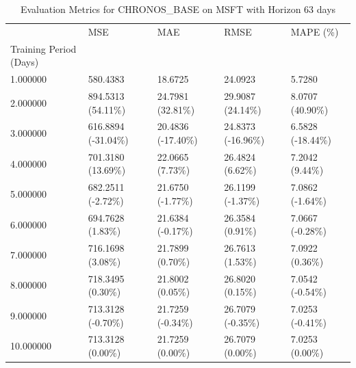 \begin{table}
\caption{Evaluation Metrics for CHRONOS_BASE on MSFT with Horizon 63 days}
\label{tab:chronos_base_MSFT_h63_metrics}
\begin{tabular}{lllll}
\toprule
 & MSE & MAE & RMSE & MAPE (\%) \\
Training Period (Days) &  &  &  &  \\
\midrule
1.000000 & 580.4383 & 18.6725 & 24.0923 & 5.7280 \\
2.000000 & 894.5313 (54.11\%) & 24.7981 (32.81\%) & 29.9087 (24.14\%) & 8.0707 (40.90\%) \\
3.000000 & 616.8894 (-31.04\%) & 20.4836 (-17.40\%) & 24.8373 (-16.96\%) & 6.5828 (-18.44\%) \\
4.000000 & 701.3180 (13.69\%) & 22.0665 (7.73\%) & 26.4824 (6.62\%) & 7.2042 (9.44\%) \\
5.000000 & 682.2511 (-2.72\%) & 21.6750 (-1.77\%) & 26.1199 (-1.37\%) & 7.0862 (-1.64\%) \\
6.000000 & 694.7628 (1.83\%) & 21.6384 (-0.17\%) & 26.3584 (0.91\%) & 7.0667 (-0.28\%) \\
7.000000 & 716.1698 (3.08\%) & 21.7899 (0.70\%) & 26.7613 (1.53\%) & 7.0922 (0.36\%) \\
8.000000 & 718.3495 (0.30\%) & 21.8002 (0.05\%) & 26.8020 (0.15\%) & 7.0542 (-0.54\%) \\
9.000000 & 713.3128 (-0.70\%) & 21.7259 (-0.34\%) & 26.7079 (-0.35\%) & 7.0253 (-0.41\%) \\
10.000000 & 713.3128 (0.00\%) & 21.7259 (0.00\%) & 26.7079 (0.00\%) & 7.0253 (0.00\%) \\
\bottomrule
\end{tabular}
\end{table}
